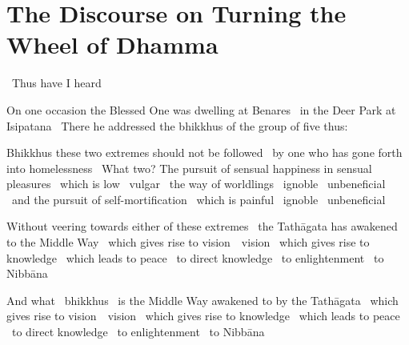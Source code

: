 
\section{The Discourse on Turning the Wheel of Dhamma}
\label{wheel-of-dhamma-full}

\begin{leader-english}
  \anglebracketleft\ \hspace{-0.5mm}Thus have I heard \hspace{-0.5mm}\anglebracketright\
\end{leader-english}

\begin{english-only-hang}
  On one occasion the Blessed One was dwelling at Benares \breathmark\ in the Deer Park at Isipatana \breathmark\ There he addressed the bhikkhus of the group of five thus:
\end{english-only-hang}

\begin{english-only-hang}
  Bhikkhus these two extremes should not be followed \breathmark\ by one who has gone forth into homelessness \breathmark\ What two? The pursuit of sensual happiness in sensual pleasures \breathmark\ which is low \breathmark\ vulgar \breathmark\ the way of worldlings \breathmark\ ignoble \breathmark\ unbeneficial \breathmark\ and the pursuit of self-mortification \breathmark\ which is painful \breathmark\ ignoble \breathmark\ unbeneficial
\end{english-only-hang}

\begin{english-only-hang}
  Without veering towards either of these extremes \breathmark\ the Tathāgata has awakened to the Middle Way \breathmark\ which gives rise to \ifbsixversion \mbox{vision}~\breathmark\ \else vision \breathmark\ \fi which gives rise to knowledge \breathmark\ which leads to peace \breathmark\ to direct knowledge \breathmark\ to enlightenment \breathmark\ to Nibbāna
\end{english-only-hang}

\begin{english-only-hang}
  And what \breathmark\ bhikkhus \breathmark\ is the Middle Way awakened to by the Tathāgata \breathmark\ which gives rise to \ifbsixversion \mbox{vision}~\breathmark\ \else vision \breathmark\ \fi which gives rise to knowledge \breathmark\ which leads to peace \breathmark\ to direct knowledge \breathmark\ to enlightenment \breathmark\ to Nibbāna
\end{english-only-hang}

